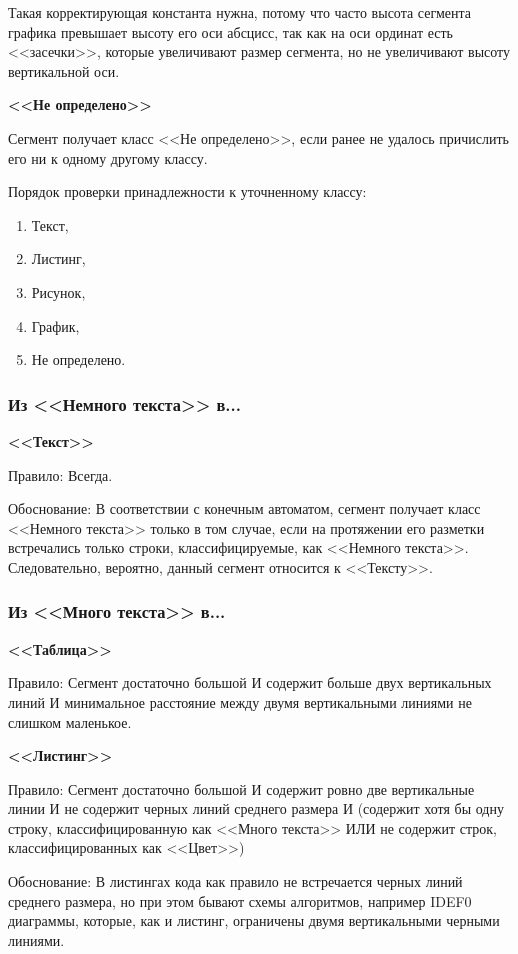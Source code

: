 Такая корректирующая константа нужна, потому что часто высота сегмента графика превышает высоту его оси абсцисс, так как на оси ординат есть <<засечки>>, которые увеличивают размер сегмента, но не увеличивают высоту вертикальной оси.

\textbf{<<Не определено>>}

Сегмент получает класс <<Не определено>>, если ранее не удалось причислить его ни к одному другому классу.

Порядок проверки принадлежности к уточненному классу:
\begin{enumerate}
    \item Текст,
    \item Листинг,
    \item Рисунок,
    \item График,
    \item Не определено.
\end{enumerate}

\subsubsection*{Из <<Немного текста>> в...}

\textbf{<<Текст>>}

Правило: Всегда.

Обоснование: В соответствии с конечным автоматом, сегмент получает класс <<Немного текста>> только в том случае, если на протяжении его разметки встречались только строки, классифицируемые, как <<Немного текста>>.
Следовательно, вероятно, данный сегмент относится к <<Тексту>>.

\subsubsection*{Из <<Много текста>> в...}

\textbf{<<Таблица>>}

Правило: Сегмент достаточно большой И содержит больше двух вертикальных линий И минимальное расстояние между двумя вертикальными линиями не слишком маленькое.

\textbf{<<Листинг>>}

Правило: Сегмент достаточно большой И содержит ровно две вертикальные линии И не содержит черных линий среднего размера И (содержит хотя бы одну строку, классифицированную как <<Много текста>> ИЛИ не содержит строк, классифицированных как <<Цвет>>)

Обоснование: В листингах кода как правило не встречается черных линий среднего размера, но при этом бывают схемы алгоритмов, например IDEF0 диаграммы, которые, как и листинг, ограничены двумя вертикальными черными линиями.

